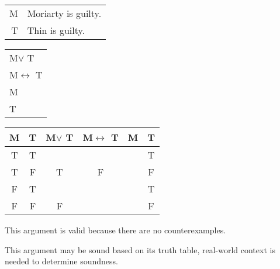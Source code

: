 \section{}
\centering
\begin{tabular}{r l}
    M & Moriarty is guilty. \\
    T & Thin is guilty.
\end{tabular}
\begin{tabular}{l}
    M$\lor$ T\\
    M$\leftrightarrow$ T\\
    M\\
    \hline
    T
\end{tabular}

\begin{tabular}{c|c||c|c|c||c}
    M & T & M$\lor$ T & M$\leftrightarrow$ T & M & T \\
    \hline
    T & T &   &   &   & T \\
    T & F & T & F &   & F \\
    F & T &   &   &   & T \\
    F & F & F &   &   & F
\end{tabular}

\justifying
\noindent This argument is valid because there are no counterexamples.

\noindent This argument may be sound based on its truth table, real-world context is needed to determine soundness.